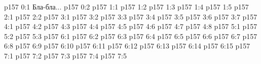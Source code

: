 \author{Промежуточные создания}
\vs p157 0:1  Бла-бла...
\vs p157 0:2 
\vs p157 1:1 
\vs p157 1:2 
\vs p157 1:3 
\vs p157 1:4 
\vs p157 1:5 
\vs p157 2:1 
\vs p157 2:2 \pc 
{}
\vs p157 3:1 
\vs p157 3:2 
\vs p157 3:3 
\vs p157 3:4 \pc 
\vs p157 3:5 \pc 
\vs p157 3:6 
\vs p157 3:7 
\vs p157 4:1 
\vs p157 4:2 
\vs p157 4:3 
\vs p157 4:4 
\vs p157 4:5 
\vs p157 4:6 \pc 
\vs p157 4:7 
\vs p157 4:8 \pc 
{}
\vs p157 5:1 
\vs p157 5:2 
\vs p157 5:3 
\vs p157 6:1 
\vs p157 6:2 \pc 
\vs p157 6:3 
\vs p157 6:4 
\vs p157 6:5 \pc 
\vs p157 6:6 
\vs p157 6:7 
\vs p157 6:8 \pc 
\vs p157 6:9 \pc 
\vs p157 6:10 \pc 
\vs p157 6:11 \pc 
\vs p157 6:12 \pc 
\vs p157 6:13 \pc 
\vs p157 6:14 
\vs p157 6:15 \pc 
{}
\vs p157 7:1 
\vs p157 7:2 
\vs p157 7:3 
\vs p157 7:4 
\vs p157 7:5 \pc 
\quizlink
